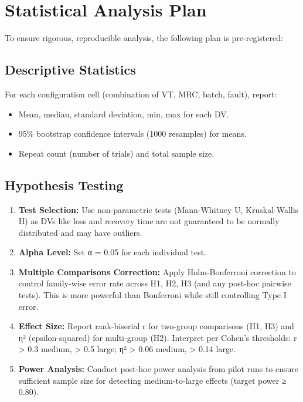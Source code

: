 \section{Statistical Analysis Plan}

To ensure rigorous, reproducible analysis, the following plan is pre-registered:

\subsection{Descriptive Statistics}

For each configuration cell (combination of VT, MRC, batch, fault), report:
\begin{itemize}
    \item Mean, median, standard deviation, min, max for each DV.
    \item 95\% bootstrap confidence intervals (1000 resamples) for means.
    \item Repeat count (number of trials) and total sample size.
\end{itemize}

\subsection{Hypothesis Testing}

\begin{enumerate}
    \item \textbf{Test Selection:} Use non-parametric tests (Mann-Whitney U, Kruskal-Wallis H) as DVs like loss and recovery time are not guaranteed to be normally distributed and may have outliers.
    \item \textbf{Alpha Level:} Set α = 0.05 for each individual test.
    \item \textbf{Multiple Comparisons Correction:} Apply Holm-Bonferroni correction to control family-wise error rate across H1, H2, H3 (and any post-hoc pairwise tests). This is more powerful than Bonferroni while still controlling Type I error.
    \item \textbf{Effect Size:} Report rank-biserial r for two-group comparisons (H1, H3) and η² (epsilon-squared) for multi-group (H2). Interpret per Cohen's thresholds: r > 0.3 medium, > 0.5 large; η² > 0.06 medium, > 0.14 large.
    \item \textbf{Power Analysis:} Conduct post-hoc power analysis from pilot runs to ensure sufficient sample size for detecting medium-to-large effects (target power ≥ 0.80).
\end{enumerate}

